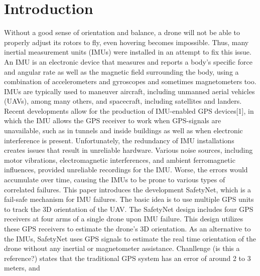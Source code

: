 \documentclass[journal,onecolumn]{IEEEtran}
\begin{document}
\section{Introduction}
%
%
%
%
Without a good sense of orientation and balance, a drone will not be able to properly adjust its rotors to fly, even hovering becomes impossible.
Thus, many inertial measurement units (IMUs) were installed in an attempt to fix this issue.
An IMU is an electronic device that measures and reports a body’s specific force and angular rate as well as the magnetic field
surrounding the body, using a combination of accelerometers and gyroscopes and sometimes magnetometers too.\\
IMUs are typically used to maneuver aircraft, including unmanned aerial vehicles
(UAVs), among many others, and spacecraft, including satellites and landers.
Recent developments allow for the production of IMU-enabled GPS devices[1], in which the IMU allows the GPS receiver to work when GPS-signals are unavailable, such as in tunnels and inside buildings as well as when electronic
interference is present. Unfortunately, the redundancy of IMU installations creates issues that result in unreliable hardware. Various noise sources, including
motor vibrations, electromagnetic interferences, and ambient ferromagnetic influences, provided unreliable recordings for the IMU. Worse, the errors would accumulate over time, causing the IMUs to be prone to various types of correlated failures.
This paper introduces the development SafetyNet, which is a fail-safe mechanism for IMU failures. The basic idea is to use multiple GPS units to track the 3D orientation of the UAV. The SafetyNet design includes four GPS receivers at four arms of a single drone upon IMU
failure. This design utilizes these GPS receivers to estimate the drone's 3D orientation.
As an alternative to the IMUs, SafetyNet uses GPS signals to estimate the real time orientation of the drone without any
inertial or magnetometer assistance. Chanllenge (is this a reference?) states that the traditional GPS system has an error of around 2 to 3 meters, and
\end{document}

